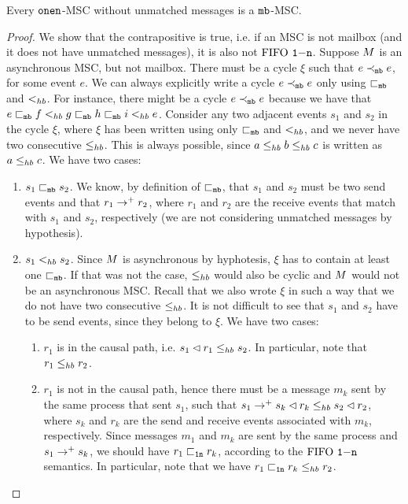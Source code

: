 \begin{proposition} \label{prop:onen_mb_no_unmatched}
	Every $\mathtt{onen}$-MSC without unmatched messages is a $\mathtt{mb}$-MSC.
\end{proposition}
\begin{proof}
We show that the contrapositive is true, i.e. if an MSC is not mailbox (and it does not have unmatched messages), it is also not $\text{FIFO } \mathtt{1\mathsf{-}n}$. Suppose $M$ is an asynchronous MSC, but not mailbox. There must be a cycle $\xi$ such that  
$e \prec_{\mathtt{mb}} e$, for some event $e$. 
We can always explicitly  write a cycle $e \prec_{\mathtt{mb}} e$ only using $\sqsubset_{\mathtt{mb}}$ and $<_{hb}$. For instance, there might be a cycle $e \prec_{\mathtt{mb}} e$ because we have that $e \sqsubset_{\mathtt{mb}} f <_{hb} g \sqsubset_{\mathtt{mb}} h \sqsubset_{\mathtt{mb}} i <_{hb} e$. Consider any two adjacent events $s_1$ and $s_2$ in the cycle $\xi$, where $\xi$ has been written using only $\sqsubset_{\mathtt{mb}}$ and $<_{hb}$, and we never have two consecutive $\leq_{hb}$. This is always possible, since $a \leq_{hb} b \leq_{hb} c$ is written as $a \leq_{hb} c$. We have two cases:
\begin{enumerate}
	\item $s_1 \sqsubset_{\mathtt{mb}} s_2$. We know, by definition of $\sqsubset_{\mathtt{mb}}$, that $s_1$ and $s_2$ must be two send events and that $r_1 \to^+ r_2$, where $r_1$ and $r_2$ are the receive events that match with $s_1$ and $s_2$, respectively (we are not considering unmatched messages by hypothesis).
	\item $s_1 <_{hb} s_2$. Since $M$ is asynchronous by hyphotesis, $\xi$ has to contain at least one $\sqsubset_{\mathtt{mb}}$. If that was not the case, $\leq_{hb}$ would also be cyclic and $M$ would not be an asynchronous MSC. Recall that we also wrote $\xi$ in such a way that we do not have two consecutive $\leq_{hb}$. It is not difficult to see that $s_1$ and $s_2$ have to be send events, since they belong to $\xi$. We have two cases:
	\begin{enumerate}
		\item $r_1$ is in the causal path, i.e. $s_1 \lhd r_1 \leq_{hb} s_2$. In particular, note that $r_1 \leq_{hb} r_2$.
		\item $r_1$ is not in the causal path, hence there must be a message $m_k$ sent by the same process that sent $s_1$, such that $s_1 \to^+ s_k \lhd r_k \leq_{hb} s_2 \lhd r_2$, where $s_k$ and $r_k$ are the send and receive events associated with $m_k$, respectively. Since messages $m_1$ and $m_k$ are sent by the same process and $s_1 \to^+ s_k$, we should have $r_1 \sqsubset_{\mathtt{1n}} r_k$, according to the $\text{FIFO } \mathtt{1\mathsf{-}n}$ semantics. In particular, note that we have $r_1 \sqsubset_{\mathtt{1n}} r_k \leq_{hb} r_2$.

\end{enumerate}
\end{enumerate}
\end{proof}
